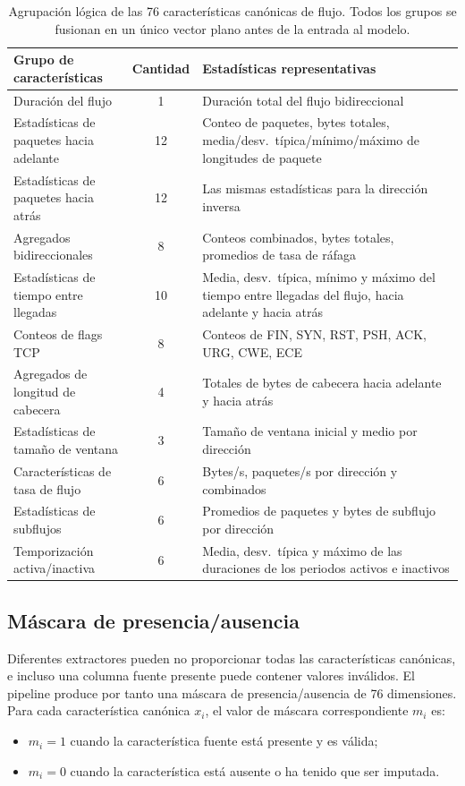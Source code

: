 \begin{table}[htbp]
\centering
\begin{tabular}{lcp{7cm}}
\toprule
Grupo de características & Cantidad & Estadísticas representativas \\
\midrule
Duración del flujo & 1 & Duración total del flujo bidireccional \\
Estadísticas de paquetes hacia adelante & 12 & Conteo de paquetes, bytes totales, media/desv.\ típica/mínimo/máximo de longitudes de paquete \\
Estadísticas de paquetes hacia atrás & 12 & Las mismas estadísticas para la dirección inversa \\
Agregados bidireccionales & 8 & Conteos combinados, bytes totales, promedios de tasa de ráfaga \\
Estadísticas de tiempo entre llegadas & 10 & Media, desv.\ típica, mínimo y máximo del tiempo entre llegadas del flujo, hacia adelante y hacia atrás \\
Conteos de flags TCP & 8 & Conteos de FIN, SYN, RST, PSH, ACK, URG, CWE, ECE \\
Agregados de longitud de cabecera & 4 & Totales de bytes de cabecera hacia adelante y hacia atrás \\
Estadísticas de tamaño de ventana & 3 & Tamaño de ventana inicial y medio por dirección \\
Características de tasa de flujo & 6 & Bytes/s, paquetes/s por dirección y combinados \\
Estadísticas de subflujos & 6 & Promedios de paquetes y bytes de subflujo por dirección \\
Temporización activa/inactiva & 6 & Media, desv.\ típica y máximo de las duraciones de los periodos activos e inactivos \\
\bottomrule
\end{tabular}
\caption[Agrupación lógica de las 76 características canónicas]{Agrupación lógica de las 76 características canónicas de flujo. Todos los grupos se fusionan en un único vector plano antes de la entrada al modelo.}
\label{tab:canonical-groups}
\end{table}

\subsection{Máscara de presencia/ausencia}
Diferentes extractores pueden no proporcionar todas las características canónicas, e incluso una columna fuente presente puede contener valores inválidos. El pipeline produce por tanto una máscara de presencia/ausencia de 76 dimensiones. Para cada característica canónica $x_i$, el valor de máscara correspondiente $m_i$ es:
\begin{itemize}
    \item $m_i = 1$ cuando la característica fuente está presente y es válida;
    \item $m_i = 0$ cuando la característica está ausente o ha tenido que ser imputada.
\end{itemize}

